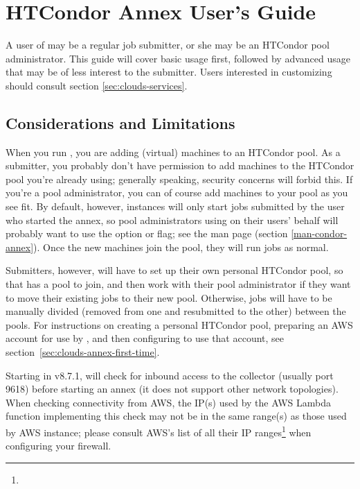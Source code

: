 \section{\label{sec:clouds-annex}HTCondor Annex User's Guide}

A user of  may be a regular job submitter, or she may be an
HTCondor pool administrator.  This guide will cover basic  usage
first, followed by advanced usage that may be of less interest to the
submitter.  Users interested in customizing  should consult
section \ref{sec:clouds-services}.

\subsection{Considerations and Limitations}

When you run , you are adding (virtual) machines to an HTCondor
pool.  As a submitter, you probably don't have permission to add machines to
the HTCondor pool you're already using; generally speaking, security concerns
will forbid this.  If you're a pool administrator, you can of course add
machines to your pool as you see fit.  By default, however, 
instances will only start jobs submitted by the user who started the annex,
so pool administrators using  on their users' behalf will
probably want to use the  option or  flag;
see the man page (section \ref{man-condor-annex}).  Once the new machines
join the pool, they will run jobs as normal.

Submitters, however, will have to set up their own personal HTCondor pool,
so that  has a pool to join, and then work with their pool
administrator if they want to move their existing jobs to their new pool.
Otherwise, jobs will have to be manually divided (removed from one and
resubmitted to the other) between the pools.  For instructions on creating
a personal HTCondor pool, preparing an AWS account for use by ,
and then configuring  to use that account, see
section~\ref{sec:clouds-annex-first-time}.

Starting in v8.7.1,  will check for inbound access to the
collector (usually port 9618) before starting an annex (it does not
support other network topologies).  When checking connectivity
from AWS, the IP(s) used by the AWS Lambda function implementing this check
may not be in the same range(s) as those used by AWS instance; please
consult AWS's list of all their IP
ranges\footnote{}
when configuring your firewall.

